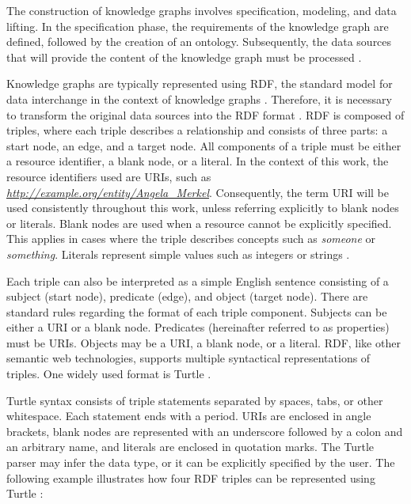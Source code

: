 \documentclass[a4paper,oneside,bibliography=totoc]{scrbook}
\begin{document}
The construction of knowledge graphs involves specification, modeling, and data lifting. In the specification phase, the requirements of the knowledge graph are defined, followed by the creation of an ontology. Subsequently, the data sources that will provide the content of the knowledge graph must be processed \cite{VillazonTerrazas2017a}.

Knowledge graphs are typically represented using \ac{RDF}, the standard model for data interchange in the context of knowledge graphs \cite{VillazonTerrazas2017}. Therefore, it is necessary to transform the original data sources into the \ac{RDF} format \cite{VillazonTerrazas2017a}. RDF is composed of triples, where each triple describes a relationship and consists of three parts: a start node, an edge, and a target node. All components of a triple must be either a resource identifier, a blank node, or a literal. In the context of this work, the resource identifiers used are \acp{URI}, such as \textit{\url{http://example.org/entity/Angela_Merkel}}. Consequently, the term \ac{URI} will be used consistently throughout this work, unless referring explicitly to blank nodes or literals. Blank nodes are used when a resource cannot be explicitly specified. This applies in cases where the triple describes concepts such as \textit{someone} or \textit{something}. Literals represent simple values such as integers or strings \cite{VillazonTerrazas2017}.

Each triple can also be interpreted as a simple English sentence consisting of a subject (start node), predicate (edge), and object (target node). There are standard rules regarding the format of each triple component. Subjects can be either a \ac{URI} or a blank node. Predicates (hereinafter referred to as properties) must be \acp{URI}. Objects may be a \ac{URI}, a blank node, or a literal. RDF, like other semantic web technologies, supports multiple syntactical representations of triples. One widely used format is Turtle \cite{VillazonTerrazas2017}.

Turtle syntax consists of triple statements separated by spaces, tabs, or other whitespace. Each statement ends with a period. \acp{URI} are enclosed in angle brackets, blank nodes are represented with an underscore followed by a colon and an arbitrary name, and literals are enclosed in quotation marks. The Turtle parser may infer the data type, or it can be explicitly specified by the user. The following example illustrates how four RDF triples can be represented using Turtle \cite{Tomaszuk2020}:
\end{document}

